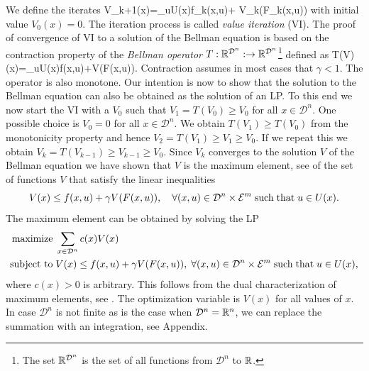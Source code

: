 \documentclass{article}
\begin{document}
We define the iterates
%
\BEQ
V_{k+1}(x)=\min_{u\in U(x)}\left\lbrace f_k(x,u)+\gamma 
V_k\left(F_k(x,u)\right)\right\rbrace
\EEQ
%
with initial value $V_0(x)=0$. The iteration process is called 
{\it value iteration} (VI). 
The proof of convergence of VI to a solution of the Bellman
equation is based on
the contraction property of the {\it Bellman operator} 
$T:\mathbb{R}^{{\mathcal D}^n}:\rightarrow\mathbb{R}^{{\mathcal D}^n}$\footnote{The set
$\mathbb{R}^{{\mathcal D}^n}$ is the set of all functions from $\mathcal D^n$ to 
$\mathbb{R}$.}  defined as
%
\BEQ
T(V)(x)=\min_{u\in U(x)}\left\lbrace f(x,u)+\gamma V(F(x,u))\right\rbrace.\label{eqn:bellman-operator}
\EEQ
%
Contraction assumes in most cases that $\gamma<1$. 
The operator is also monotone. Our intention is now to show that the solution to the Bellman equation can
also be obtained as the solution of an LP. To this end 
we now start the VI
with a $V_0$ such that $V_1=T(V_0)\geq V_0$ for all $x\in{\mathcal D}^n$. 
One possible choice is $V_0=0$ for all $x\in\mathcal D^n$. 
We obtain 
$T(V_1)\geq T(V_0)$ from the monotonicity property and hence
$V_2=T(V_1)\geq V_1\geq V_0$. If we repeat this we obtain 
$V_k=T(V_{k-1})\geq V_{k-1} \geq V_0$. Since $V_k$ converges to the 
solution $V$ of the Bellman equation we have shown that $V$ is the 
maximum element, see \cite[p. 45]{boy+van04} of the set of functions 
$V$ that satisfy the linear 
inequalities
%
$$V(x)\leq f(x,u)+\gamma V(F(x,u)),\quad \forall (x,u)\in{\mathcal D}^n\times{\mathcal E}^m\; {\rm such\; that}\; u\in U(x).$$
%
The maximum element can be obtained by solving the LP
%
\begin{align}
\mbox{maximize}\;&\sum_{x\in \mathcal D^n}c(x)V(x)\label{eqn:Bellman-LP-obj}\\
\mbox{subject to} \;&V(x)\leq f(x,u)+\gamma V(F(x,u)),\;\forall (x,u)\in {\mathcal D}^n\times{\mathcal E}^m
\; {\rm such\; that}\; u\in U(x),
\label{eqn:Bellman-LP-con}
\end{align}
%
where $c(x)>0$ is arbitrary. 
This follows from the dual characterization of maximum elements, see
\cite[p. 54]{boy+van04}. The optimization
variable is $V(x)$ for all values of $x$. In case $\mathcal D^n$ is not
finite as is the case when $\mathcal D^n=\mathbb{R}^n$, we can replace
the summation with an integration, see Appendix.  
%
\end{document}
